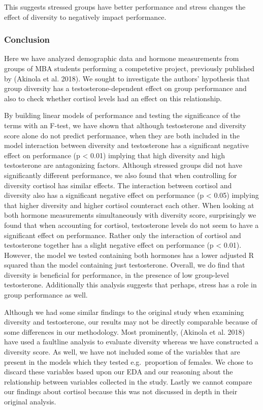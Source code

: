 \documentclass[]{article}
\begin{document}
This suggests stressed groups have better performance and stress changes
the effect of diversity to negatively impact performance.

\hypertarget{conclusion}{%
\subsubsection{Conclusion}\label{conclusion}}

Here we have analyzed demographic data and hormone measurements from
groups of MBA students performing a competetive project, previously
published by (Akinola et al. 2018). We sought to investigate the
authors' hypothesis that group diversity has a testosterone-dependent
effect on group performance and also to check whether cortisol levels
had an effect on this relationship.

By building linear models of performance and testing the significance of
the terms with an F-test, we have shown that although testosterone and
diversity score alone do not predict performance, when they are both
included in the model interaction between diversity and testosterone has
a significant negative effect on performance (p \textless{} 0.01)
implying that high diversity and high testosterone are antagonizing
factors. Although stressed groups did not have significantly different
performance, we also found that when controlling for diversity cortisol
has similar effects. The interaction between cortisol and diversity also
has a significant negative effect on performance (p \textless{} 0.05)
implying that higher diversity and higher cortisol counteract each
other. When looking at both hormone measurements simultaneously with
diversity score, surprisingly we found that when accounting for
cortisol, testosterone levels do not seem to have a significant effect
on performance. Rather only the interaction of cortisol and testosterone
together has a slight negative effect on performance (p \textless{}
0.01). However, the model we tested containing both hormones has a lower
adjusted R squared than the model containing just testosterone. Overall,
we do find that diversity is beneficial for performance, in the presence
of low group-level testosterone. Additionally this analysis suggests
that perhaps, stress has a role in group performance as well.

Although we had some similar findings to the original study when
examining diversity and testosterone, our results may not be directly
comparable because of some differences in our methodology. Most
prominently, (Akinola et al. 2018) have used a faultline analysis to
evaluate diversity whereas we have constructed a diversity score. As
well, we have not included some of the variables that are present in the
models which they tested e.g.~proportion of females. We chose to discard
these variables based upon our EDA and our reasoning about the
relationship between variables collected in the study. Lastly we cannot
compare our findings about cortisol because this was not discussed in
depth in their original analysis.
\end{document}
